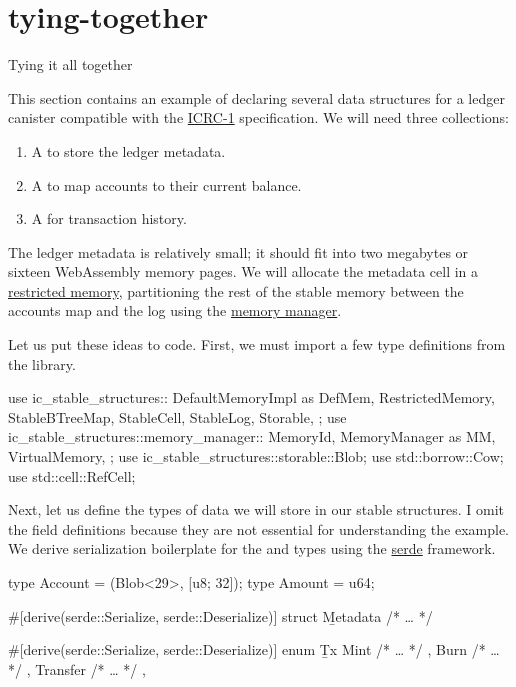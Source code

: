 \documentclass{article}
\begin{document}
\section{tying-together}{Tying it all together}

This section contains an example of declaring several data structures for a ledger canister compatible with the \href{https://github.com/dfinity/ICRC-1/blob/3c64844bc6219e1d07ce05e27ec636df1e562114/standards/ICRC-1/README.md}{ICRC-1} specification.
We will need three collections:
\begin{enumerate}
  \item
    A \href{#stable-cell}{} to store the ledger metadata.
  \item
    A \href{#stable-btree}{} to map accounts  to their current balance.
  \item A \href{#stable-log}{} for transaction history.
\end{enumerate}

The ledger metadata is relatively small; it should fit into two megabytes or sixteen WebAssembly memory pages.
We will allocate the metadata cell in a \href{#restricted-memory}{restricted memory}, partitioning the rest of the stable memory between the accounts map and the log using the \href{#memory-manager}{memory manager}.

Let us put these ideas to code.
First, we must import a few type definitions from the library.

\begin{code}[rust]
use ic_stable_structures::{
  DefaultMemoryImpl as DefMem,
  RestrictedMemory,
  StableBTreeMap,
  StableCell,
  StableLog,
  Storable,
};
use ic_stable_structures::memory_manager::{
  MemoryId,
  MemoryManager as MM,
  VirtualMemory,
};
use ic_stable_structures::storable::Blob;
use std::borrow::Cow;
use std::cell::RefCell;
\end{code}

Next, let us define the types of data we will store in our stable structures.
I omit the field definitions because they are not essential for understanding the example.
We derive serialization boilerplate for the  and  types using the \href{https://serde.rs/}{serde} framework.

\begin{code}[rust]
type Account = (Blob<29>, [u8; 32]);
type Amount = u64;

#[derive(serde::Serialize, serde::Deserialize)]
struct \b{Metadata} { /* … */ }

#[derive(serde::Serialize, serde::Deserialize)]
enum \b{Tx} {
  Mint { /* … */ },
  Burn { /* … */ },
  Transfer { /* … */ },
}
\end{code}
\end{document}

